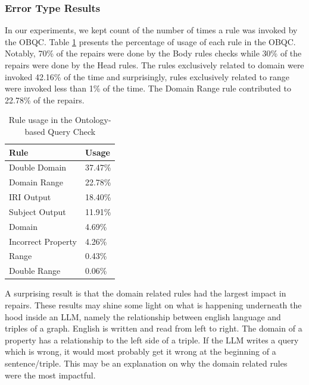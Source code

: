 \documentclass[11pt]{article}
\begin{document}
\subsubsection{Error Type Results}

In our experiments, we kept count of the number of times a rule was invoked by the OBQC.
Table \ref{table:RuleUsage} presents the percentage of usage of each rule in the OBQC. 
Notably, 70\% of the repairs were done by the Body rules checks while 30\% of the repairs were done by the Head rules. 
The rules exclusively related to domain were invoked 42.16\% of the time and surprisingly, rules exclusively related to range were invoked less than 1\% of the time. 
The Domain Range rule contributed to 22.78\% of the repairs.

\begin{table}
\centering
\begin{tabular}{ | m{3cm} | m{2cm} |} 
\hline
  \textbf{Rule} & \textbf{Usage}\\ 
  \hline
  Double Domain   & 37.47\% \\ 
  \hline
  Domain Range   & 22.78\% \\ 
  \hline
  IRI Output& 18.40\% \\ 
  \hline
  Subject Output& 11.91\% \\  
  \hline
  Domain& 4.69\% \\ 
  \hline
  Incorrect Property& 4.26\% \\ 
  \hline
  Range& 0.43\% \\ 
  \hline
  Double Range& 0.06\% \\ 
  \hline
\end{tabular}
\caption{Rule usage in the Ontology-based Query Check}
\label{table:RuleUsage}
\end{table}

A surprising result is that the domain related rules had the largest impact in repairs. 
These results may shine some light on what is happening underneath the hood inside an LLM, namely the relationship between english language and triples of a graph. 
English is written and read from left to right. 
The domain of a property has a relationship to the left side of a triple.
If the LLM writes a query which is wrong, it would most probably get it wrong at the beginning of a sentence/triple. 
This may be an explanation on why the domain related rules were the most impactful. 
\end{document}
